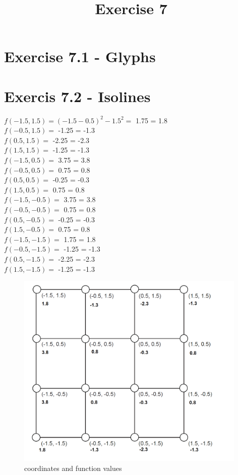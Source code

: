 \documentclass[a4paper]{article}
\date{}
\author{}
\title{Exercise 7}
\begin{document}
\maketitle 
\thispagestyle{fancy}


\section*{Exercise 7.1 - Glyphs}


\section*{Exercis 7.2 - Isolines}

$f(-1.5, 1.5) = (-1.5 - 0.5)^{2} - 1.5^{2} =$ 1.75 = 1.8\\
$f(-0.5, 1.5) =$ -1.25 = -1.3\\
$f(0.5, 1.5) =$ -2.25 = -2.3\\
$f(1.5, 1.5) =$ -1.25 = -1.3\\
$f(-1.5, 0.5) =$ 3.75 = 3.8\\
$f(-0.5, 0.5) =$ 0.75 = 0.8\\
$f(0.5, 0.5) =$ -0.25 = -0.3\\
$f(1.5, 0.5) =$ 0.75 = 0.8\\
$f(-1.5, -0.5) =$ 3.75 = 3.8\\
$f(-0.5, -0.5) =$ 0.75 = 0.8\\
$f(0.5, -0.5) =$ -0.25 = -0.3\\
$f(1.5, -0.5) =$ 0.75 = 0.8 \\
$f(-1.5, -1.5) =$ 1.75 = 1.8 \\
$f(-0.5, -1.5) =$ -1.25 = -1.3\\
$f(0.5, -1.5) =$ -2.25 = -2.3\\
$f(1.5, -1.5) =$ -1.25 = -1.3\\

\begin{figure}[h!]
	\centering 
	\includegraphics[width=11cm]{7_2_1.png}
	\caption{coordinates and function values }
	\label{fig:coordinates}
\end{figure}
\end{document}
